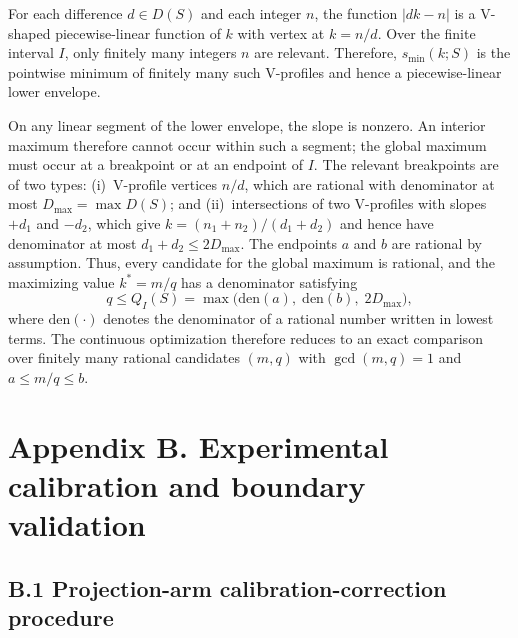 \documentclass{optica-article}%
\begin{document}
For each difference $d\in D(S)$ and each integer $n$, the function $|dk-n|$ is a V-shaped piecewise-linear function of $k$ with vertex at $k=n/d$. Over the finite interval $I$, only finitely many integers $n$ are relevant. Therefore, $s_{\min}(k;S)$ is the pointwise minimum of finitely many such V-profiles and hence a piecewise-linear lower envelope.

On any linear segment of the lower envelope, the slope is nonzero. An interior maximum therefore cannot occur within such a segment; the global maximum must occur at a breakpoint or at an endpoint of $I$. The relevant breakpoints are of two types: (i)~V-profile vertices $n/d$, which are rational with denominator at most $D_{\max}=\max D(S)$; and (ii)~intersections of two V-profiles with slopes $+d_1$ and $-d_2$, which give $k=(n_1+n_2)/(d_1+d_2)$ and hence have denominator at most $d_1+d_2\le 2D_{\max}$. The endpoints $a$ and $b$ are rational by assumption. Thus, every candidate for the global maximum is rational, and the maximizing value $k^*=m/q$ has a denominator satisfying
\begin{equation}
q \le Q_I(S)=\max\!\bigl(\mathrm{den}(a),\;\mathrm{den}(b),\;2D_{\max}\bigr),
\label{eq:supp_Q_bound}
\end{equation}
where $\mathrm{den}(\cdot)$ denotes the denominator of a rational number written in lowest terms. The continuous optimization therefore reduces to an exact comparison over finitely many rational candidates $(m,q)$ with $\gcd(m,q)=1$ and $a\le m/q\le b$.

\section*{Appendix B. Experimental calibration and boundary validation}

\subsection*{B.1 Projection-arm calibration-correction procedure}
\end{document}
